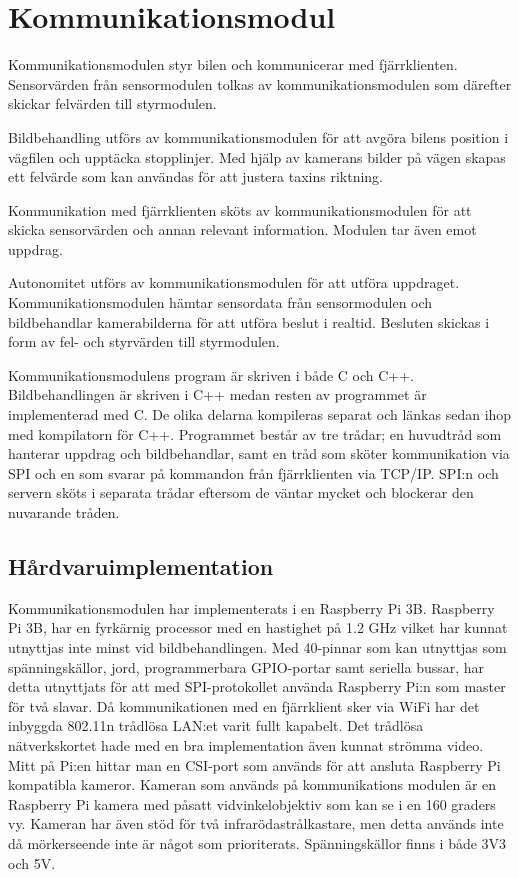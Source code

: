 \documentclass[tekniskrapport/tech.tex]{subfiles}
\begin{document}
\section{Kommunikationsmodul}
Kommunikationsmodulen styr bilen och kommunicerar med fjärrklienten.
Sensorvärden från sensormodulen tolkas av kommunikationsmodulen som därefter
skickar felvärden till styrmodulen.

Bildbehandling utförs av kommunikationsmodulen för att
avgöra bilens position i vägfilen och upptäcka stopplinjer. Med hjälp av
kamerans bilder på vägen skapas ett felvärde som kan användas för att justera
taxins riktning.

Kommunikation med fjärrklienten sköts av kommunikationsmodulen för
att skicka sensorvärden och annan relevant information. Modulen tar
även emot uppdrag.

Autonomitet utförs av kommunikationsmodulen för att utföra uppdraget.
Kommunikationsmodulen hämtar sensordata från sensormodulen och bildbehandlar
kamerabilderna för att utföra beslut i realtid. Besluten skickas i form av fel-
och styrvärden till styrmodulen.

Kommunikationsmodulens program är skriven i både C och C++. Bildbehandlingen är
skriven i C++ medan resten av programmet är implementerad med C. De olika
delarna kompileras separat och länkas sedan ihop med kompilatorn för C++.
Programmet består av tre trådar; en huvudtråd som hanterar uppdrag och
bildbehandlar, samt en tråd som sköter kommunikation via SPI och en som svarar
på kommandon från fjärrklienten via TCP/IP. SPI:n och servern sköts i separata
trådar eftersom de väntar mycket och blockerar den nuvarande tråden.

\subsection{Hårdvaruimplementation} 
Kommunikationsmodulen har implementerats i en Raspberry Pi 3B. Raspberry Pi 3B,
har en fyrkärnig processor med en hastighet på 1.2 GHz vilket har kunnat
utnyttjas inte minst vid bildbehandlingen. Med 40-pinnar som kan utnyttjas som
spänningskällor, jord, programmerbara GPIO-portar samt seriella bussar, har
detta utnyttjats för att med SPI-protokollet använda Raspberry Pi:n som master
för två slavar. Då kommunikationen med en fjärrklient sker via WiFi har det
inbyggda 802.11n trådlösa LAN:et varit fullt kapabelt. Det trådlösa
nätverkskortet hade med en bra implementation även kunnat strömma video. Mitt
på Pi:en hittar man en CSI-port som används för att ansluta Raspberry Pi
kompatibla kameror. Kameran som används på kommunikations modulen är en
Raspberry Pi kamera med påsatt vidvinkelobjektiv som kan se i en 160 graders vy.
Kameran har även stöd för två infrarödastrålkastare, men detta används inte då
mörkerseende inte är något som prioriterats. Spänningskällor finns i både 3V3
och 5V.
\end{document}
